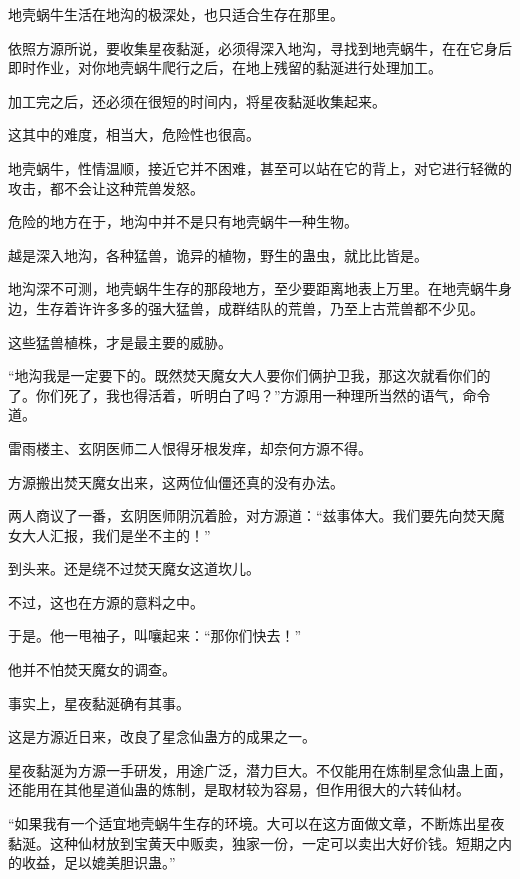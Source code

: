
\begin{this_body}



地壳蜗牛生活在地沟的极深处，也只适合生存在那里。

依照方源所说，要收集星夜黏涎，必须得深入地沟，寻找到地壳蜗牛，在在它身后即时作业，对你地壳蜗牛爬行之后，在地上残留的黏涎进行处理加工。

加工完之后，还必须在很短的时间内，将星夜黏涎收集起来。

这其中的难度，相当大，危险性也很高。

地壳蜗牛，性情温顺，接近它并不困难，甚至可以站在它的背上，对它进行轻微的攻击，都不会让这种荒兽发怒。

危险的地方在于，地沟中并不是只有地壳蜗牛一种生物。

越是深入地沟，各种猛兽，诡异的植物，野生的蛊虫，就比比皆是。

地沟深不可测，地壳蜗牛生存的那段地方，至少要距离地表上万里。在地壳蜗牛身边，生存着许许多多的强大猛兽，成群结队的荒兽，乃至上古荒兽都不少见。

这些猛兽植株，才是最主要的威胁。

“地沟我是一定要下的。既然焚天魔女大人要你们俩护卫我，那这次就看你们的了。你们死了，我也得活着，听明白了吗？”方源用一种理所当然的语气，命令道。

雷雨楼主、玄阴医师二人恨得牙根发痒，却奈何方源不得。

方源搬出焚天魔女出来，这两位仙僵还真的没有办法。

两人商议了一番，玄阴医师阴沉着脸，对方源道：“兹事体大。我们要先向焚天魔女大人汇报，我们是坐不主的！”

到头来。还是绕不过焚天魔女这道坎儿。

不过，这也在方源的意料之中。

于是。他一甩袖子，叫嚷起来：“那你们快去！”

他并不怕焚天魔女的调查。

事实上，星夜黏涎确有其事。

这是方源近日来，改良了星念仙蛊方的成果之一。

星夜黏涎为方源一手研发，用途广泛，潜力巨大。不仅能用在炼制星念仙蛊上面，还能用在其他星道仙蛊的炼制，是取材较为容易，但作用很大的六转仙材。

“如果我有一个适宜地壳蜗牛生存的环境。大可以在这方面做文章，不断炼出星夜黏涎。这种仙材放到宝黄天中贩卖，独家一份，一定可以卖出大好价钱。短期之内的收益，足以媲美胆识蛊。”


\end{this_body}
